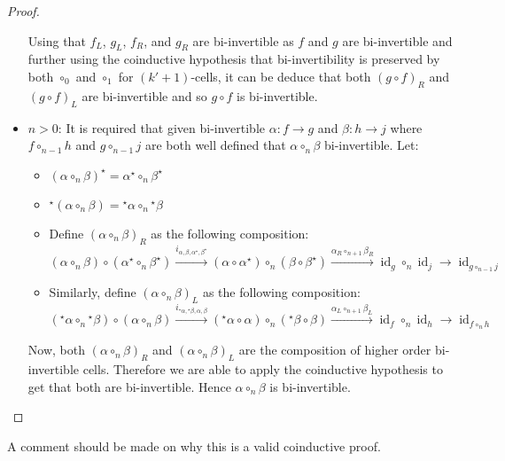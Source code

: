 \documentclass{article}
\theoremstyle{definition}
\theoremstyle{examplestyle}
\DeclareMathOperator{\id}{id}
\newcommand{\linv}[1]{{}^\star\!#1}
\newcommand{\rinv}[1]{#1^\star}
\begin{document}
\begin{proof}
\begin{itemize}
      Using that \(f_L\), \(g_L\), \(f_R\), and \(g_R\) are bi-invertible as \(f\) and \(g\) are bi-invertible and further using the coinductive hypothesis that bi-invertibility is preserved by both \(\circ_0\) and \(\circ_1\) for \((k'+1)\)-cells, it can be deduce that both \({(g \circ f)}_R\) and \({(g \circ f)}_L\) are bi-invertible and so \(g \circ f\) is bi-invertible.
    \item \(n > 0\): It is required that given bi-invertible \(\alpha: f \to g\) and \(\beta: h \to j\) where \(f \circ_{n-1} h\) and \(g \circ_{n-1} j\) are both well defined that \(\alpha \circ_n \beta\) bi-invertible. Let:
      \begin{itemize}
      \item \(\rinv {(\alpha \circ_n \beta)} = \rinv \alpha \circ_n \rinv \beta\)
      \item \(\linv {(\alpha \circ_n \beta)} = \linv \alpha \circ_n \linv \beta\)
      \item Define \({(\alpha \circ_n \beta)}_R\) as the following composition:
        \begin{equation*}
          (\alpha \circ_n \beta) \circ (\rinv \alpha \circ_n \rinv \beta) \overset {i_{\alpha,\beta,\rinv \alpha, \rinv \beta}} \to (\alpha \circ \rinv \alpha) \circ_n (\beta \circ \rinv \beta) \overset {\alpha _R \circ_{n+1} \beta _R} \to \id_g \circ_n \id_j \to \id_{g \circ_{n-1} j}
        \end{equation*}
      \item Similarly, define \({(\alpha \circ_n \beta)}_L\) as the following composition:
        \begin{equation*}
          (\linv \alpha \circ_n \linv \beta) \circ (\alpha \circ_n \beta) \overset {i_{\linv \alpha, \linv \beta, \alpha, \beta}} \to (\linv \alpha \circ \alpha) \circ_n (\linv \beta \circ \beta) \overset {\alpha _L \circ_{n+1} \beta _L} \to \id_f \circ_n \id_h \to \id_{f \circ_n h}
        \end{equation*}
    \end{itemize}
    Now, both \({(\alpha \circ_n \beta)}_R\) and \({(\alpha \circ_n \beta)}_L\) are the composition of higher order bi-invertible cells. Therefore we are able to apply the coinductive hypothesis to get that both are bi-invertible. Hence \(\alpha \circ_n \beta\) is bi-invertible.
  \end{itemize}
\end{proof}
A comment should be made on why this is a valid coinductive proof.
\end{document}
